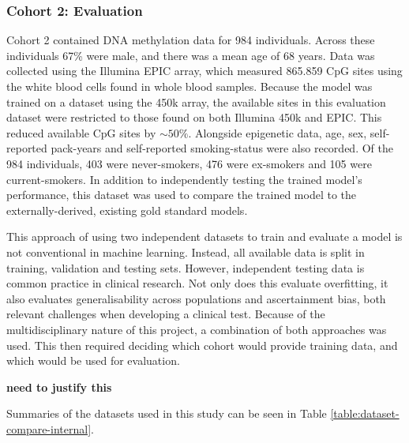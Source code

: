 \documentclass[draft]{article}
\begin{document}
\subsubsection{Cohort 2: Evaluation}
Cohort 2 contained DNA methylation data for 984 individuals. Across these individuals 67\% were male, and there was a mean age of 68 years. Data was collected using the Illumina EPIC array, which measured \num{865,859} CpG sites using the white blood cells found in whole blood samples. Because the model was trained on a dataset using the 450k array, the available sites in this evaluation dataset were restricted to those found on both Illumina 450k and EPIC. This reduced available CpG sites by \(\sim\!50\%\). Alongside epigenetic data, age, sex, self-reported pack-years and self-reported smoking-status were also recorded. Of the 984 individuals, 403 were never-smokers, 476 were ex-smokers and 105 were current-smokers. In addition to independently testing the trained model's performance, this dataset was used to compare the trained model to the externally-derived, existing gold standard models.
 
This approach of using two independent datasets to train and evaluate a model is not conventional in machine learning. Instead, all available data is split in training, validation and testing sets. However, independent testing data is common practice in clinical research. Not only does this evaluate overfitting, it also evaluates generalisability across populations and ascertainment bias, both relevant challenges when developing a clinical test. Because of the multidisciplinary nature of this project, a combination of both approaches was used. This then required deciding which cohort would provide training data, and which would be used for evaluation. 

\textbf{need to justify this}

Summaries of the datasets used in this study can be seen in Table \ref{table:dataset-compare-internal}.

\end{document}
